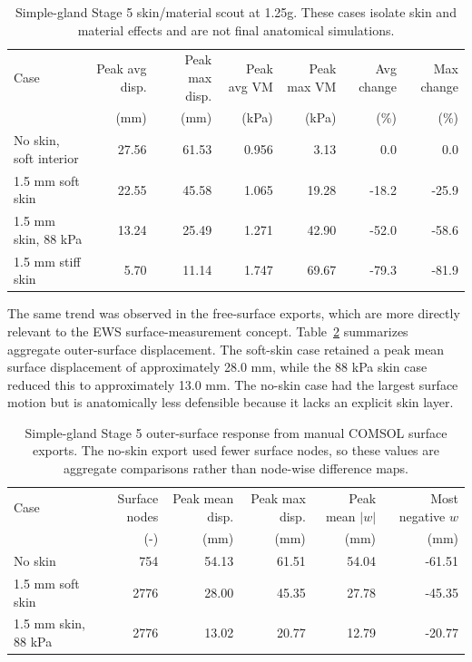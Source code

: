 \begin{table}[H]
\centering
\small
\caption{Simple-gland Stage 5 skin/material scout at 1.25g. These cases isolate skin and material effects and are not final anatomical simulations.}
\label{tab:stage5_simple_gland_skin_scout}
\begin{tabular}{lrrrrrr}
\toprule
Case & Peak avg disp. & Peak max disp. & Peak avg VM & Peak max VM & Avg change & Max change \\
 & (mm) & (mm) & (kPa) & (kPa) & (\%) & (\%) \\
\midrule
No skin, soft interior & 27.56 & 61.53 & 0.956 & 3.13 & 0.0 & 0.0 \\
1.5 mm soft skin & 22.55 & 45.58 & 1.065 & 19.28 & -18.2 & -25.9 \\
1.5 mm skin, 88 kPa & 13.24 & 25.49 & 1.271 & 42.90 & -52.0 & -58.6 \\
1.5 mm stiff skin & 5.70 & 11.14 & 1.747 & 69.67 & -79.3 & -81.9 \\
\bottomrule
\end{tabular}
\end{table}

The same trend was observed in the free-surface exports, which are more directly relevant to the EWS surface-measurement concept. Table~\ref{tab:stage5_surface_scout} summarizes aggregate outer-surface displacement. The soft-skin case retained a peak mean surface displacement of approximately 28.0 mm, while the 88 kPa skin case reduced this to approximately 13.0 mm. The no-skin case had the largest surface motion but is anatomically less defensible because it lacks an explicit skin layer.

\begin{table}[H]
\centering
\scriptsize
\caption{Simple-gland Stage 5 outer-surface response from manual COMSOL surface exports. The no-skin export used fewer surface nodes, so these values are aggregate comparisons rather than node-wise difference maps.}
\label{tab:stage5_surface_scout}
\begin{tabular}{lrrrrr}
\toprule
Case & Surface nodes & Peak mean disp. & Peak max disp. & Peak mean $|w|$ & Most negative $w$ \\
 & (-) & (mm) & (mm) & (mm) & (mm) \\
\midrule
No skin & 754 & 54.13 & 61.51 & 54.04 & -61.51 \\
1.5 mm soft skin & 2776 & 28.00 & 45.35 & 27.78 & -45.35 \\
1.5 mm skin, 88 kPa & 2776 & 13.02 & 20.77 & 12.79 & -20.77 \\
\bottomrule
\end{tabular}
\end{table}

